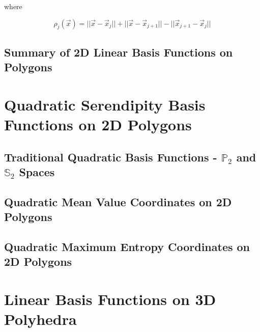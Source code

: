 \noindent where

\begin{equation}
\label{eq::BF_ME_face_funcs}
\rho_j (\vec{x}) = || \vec{x} - \vec{x}_j || + || \vec{x} - \vec{x}_{j+1} || - || \vec{x}_{j+1} - \vec{x}_j ||
\end{equation}

\subsection{Summary of 2D Linear Basis Functions on Polygons}
\label{sec::BF_2DLinear_Summary}



\section{Quadratic Serendipity Basis Functions on 2D Polygons}
\label{sec::BF_2DQuadratic}

\subsection{Traditional Quadratic Basis Functions - $\mathbb{P}_{2}$ and $\mathbb{S}_{2}$ Spaces}
\label{sec::BF_2DQuadratic_P2S2}


\subsection{Quadratic Mean Value Coordinates on 2D Polygons}
\label{sec::BF_2DQuadratic_ME}


\subsection{Quadratic Maximum Entropy Coordinates on 2D Polygons}
\label{sec::BF_2DQuadratic_ME}



\section{Linear Basis Functions on 3D Polyhedra}
\label{sec::BF_3DLinear}




